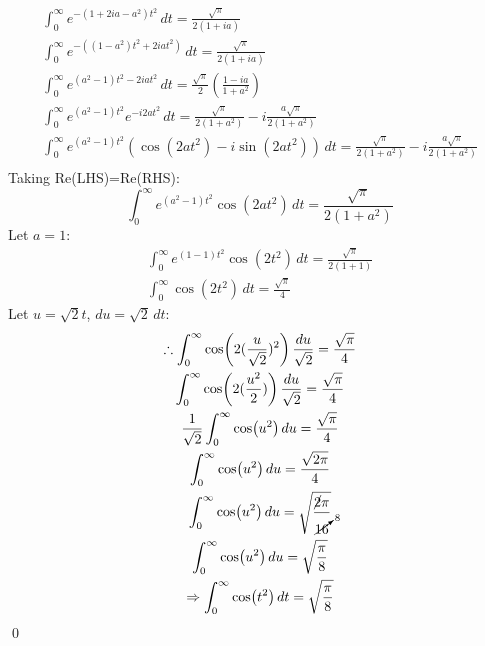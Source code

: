 \documentclass[a4paper, titlepage, DIV=14]{scrartcl}
\begin{document}
    \begin{gather*}
        \int_{0}^{\infty} e^{-(1+2ia-a^{2})t^{2}} \, dt = \frac{\sqrt{\pi}}{2(1+ia)} \\
        \int_{0}^{\infty} e^{-((1-a^{2})t^{2}+2iat^{2})} \, dt = \frac{\sqrt{\pi}}{2(1+ia)} \\
        \int_{0}^{\infty} e^{(a^{2}-1)t^{2}-2iat^{2}} \, dt = \frac{\sqrt{\pi}}{2}(\frac{1-ia}{1+a^{2}}) \\
        \int_{0}^{\infty} e^{(a^{2}-1)t^{2}}e^{-i2at^{2}} \, dt = \frac{\sqrt{\pi}}{2(1+a^{2})} - i\frac{a\sqrt{\pi}}{2(1+a^{2})} \\
        \int_{0}^{\infty} e^{(a^{2}-1)t^{2}}(\cos(2at^{2})-i\sin(2at^{2})) \, dt = \frac{\sqrt{\pi}}{2(1+a^{2})} - i\frac{a\sqrt{\pi}}{2(1+a^{2})} \\
    \end{gather*}
    Taking Re(LHS)=Re(RHS):
    \begin{equation*}
        \int_{0}^{\infty} e^{(a^{2}-1)t^{2}}\cos(2at^{2}) \, dt = \frac{\sqrt{\pi}}{2(1+a^{2})} 
    \end{equation*}
    Let $a=1$:
    \begin{gather*}
        \int_{0}^{\infty} e^{(1-1)t^{2}}\cos(2t^{2}) \, dt = \frac{\sqrt{\pi}}{2(1+1)} \\
        \int_{0}^{\infty} \cos(2t^{2}) \, dt = \frac{\sqrt{\pi}}{4} 
    \end{gather*}
    Let $u=\sqrt{2}t$, $du = \sqrt{2}\, dt$:
    \begin{gather*}
        \therefore \int_{0}^{\infty} \cos(2(\frac{u}{\sqrt{2}})^{2}) \, \frac{du}{\sqrt{2}} = \frac{\sqrt{\pi}}{4} \\
        \int_{0}^{\infty} \cos(2(\frac{u^{2}}{2})) \, \frac{du}{\sqrt{2}} = \frac{\sqrt{\pi}}{4} \\
        \frac{1}{\sqrt{2}}\int_{0}^{\infty} \cos(u^{2}) \, du= \frac{\sqrt{\pi}}{4} \\
        \int_{0}^{\infty} \cos(u^{2}) \, du= \frac{\sqrt{2\pi}}{4} \\
        \int_{0}^{\infty} \cos(u^{2}) \, du= \sqrt{\frac{\cancel{2}\pi}{\cancelto{8}{16}}} \\
        \int_{0}^{\infty} \cos(u^{2}) \, du= \sqrt{\frac{\pi}{8}} \\
        \Rightarrow \int_{0}^{\infty} \cos(t^{2}) \, dt= \sqrt{\frac{\pi}{8}} 
    \end{gather*} \qed
\end{document}
